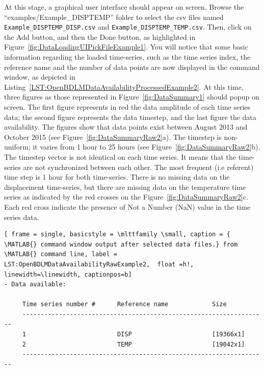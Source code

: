 At this stage, a graphical user interface should appear on screen. 
Browse the ``examples/Example\_DISPTEMP'' folder to select the csv files named   \lstinline[basicstyle = \mlttfamily \small, backgroundcolor = \color{light-gray}]!Example_DISPTEMP_DISP.csv! and  \lstinline[basicstyle = \mlttfamily \small, backgroundcolor = \color{light-gray}]!Example_DISPTEMP_TEMP.csv!.
Then, click on the Add button, and then the Done button, as highlighted in Figure~\ref{fig:DataLoadingUIPickFileExample1}.
You will notice that some basic information regarding the loaded time-series, such as the time series index, the reference name and the number of data points are now displayed in the \MATLAB{} command window, as depicted in Listing~\ref{LST:OpenBDLMDataAvailabilityProcessedExample2}.
At this time, three \MATLAB{} figures as those represented in Figure~\ref{fig:DataSummary1} should popup on screen.
The first figure represents in red the data amplitude of each time series data; the second figure represents the data timestep, and the last figure the data availability.
The figures show that data points exist between August 2013 and October 2015 (see Figure~\ref{fig:DataSummaryRaw2}a).
The timestep is non-uniform; it varies from 1 hour to 25 hours (see Figure~\ref{fig:DataSummaryRaw2}b). 
The timestep vector is not identical on each time series. 
It means that the time-series are not synchronized between each other.
The most frequent (i.e referent) time step is 1 hour for both time-series.
There is no missing data on the displacement time-series, but there are missing data on the temperature time series as indicated by the red crosses on the Figure~\ref{fig:DataSummaryRaw2}c.
Each red cross indicate the presence of Not a Number (NaN) value in the time series data.

 \begin{lstlisting}[ frame = single, basicstyle = \mlttfamily \small, caption = { \MATLAB{} command window output after selected data files.} from \MATLAB{} command line, label = LST:OpenBDLMDataAvailabilityRawExample2,  float =h!, linewidth=\linewidth, captionpos=b]
- Data available: 
 
     Time series number #      Reference name            Size                     	
     -------------------------------------------------------------------
     1                         DISP                      [19366x1]                	
     2                         TEMP                      [19042x1]                	
     -------------------------------------------------------------------
\end{lstlisting}


